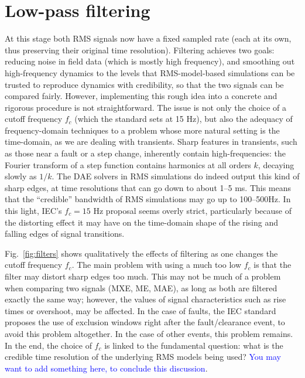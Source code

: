 \documentclass[11pt, a4paper, twoside, titlepage]{article}
\begin{document}
\section{Low-pass filtering}

At this stage both RMS signals now have a fixed sampled rate (each at its own,
thus preserving their original time resolution). Filtering achieves two goals:
reducing noise in field data (which is mostly high frequency), and smoothing out
high-frequency dynamics to the levels that RMS-model-based simulations can be
trusted to reproduce dynamics with credibility, so that the two signals can be
compared fairly. However, implementing this rough idea into a concrete and
rigorous procedure is not straightforward. The issue is not only the choice of a
cutoff frequency $f_c$ (which the standard sets at 15 Hz), but also the adequacy
of frequency-domain techniques to a problem whose more natural setting is the
time-domain, as we are dealing with transients. Sharp features in transients,
such as those near a fault or a step change, inherently contain
high-frequencies: the Fourier transform of a step function contains harmonics at
all orders $k$, decaying slowly as $1/k$. The DAE solvers in RMS simulations do
indeed output this kind of sharp edges, at time resolutions that can go down to
about 1--5 ms. This means that the ``credible'' bandwidth of RMS simulations may
go up to 100--500Hz. In this light, IEC's $f_c = 15$ Hz proposal seems overly
strict, particularly because of the distorting effect it may have on the
time-domain shape of the rising and falling edges of signal transitions.

Fig.~\ref{fig:filters} shows qualitatively the effects of filtering as one
changes the cutoff frequency $f_c$. The main problem with using a much too low
$f_c$ is that the filter may distort sharp edges too much. This may not be much
of a problem when comparing two signals (MXE, ME, MAE), as long as both are
filtered exactly the same way; however, the values of signal characteristics
such as rise times or overshoot, may be affected. In the case of faults, the IEC
standard proposes the use of exclusion windows right after the fault/clearance
event, to avoid this problem altogether. In the case of other events, this
problem remains.  In the end, the choice of $f_c$ is linked to the fundamental
question: what is the credible time resolution of the underlying RMS models
being used? \textcolor{blue}{You may want to add something here, to conclude
  this discussion}.

\end{document}
